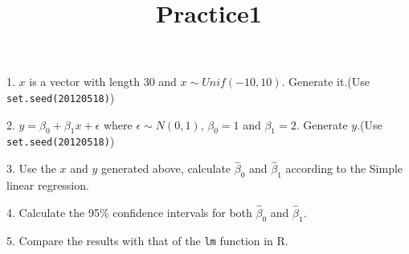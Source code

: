 \documentclass[a4paper,25pt]{article}
\title{Practice1}
\author{}
\begin{document}
\maketitle
\begin{Large}
1. $x$ is a vector with length 30 and $x \sim Unif(-10,10)$. Generate it.(Use \texttt{set.seed(20120518)})

2. $y = \beta_0 + \beta_1x + \epsilon$ where $\epsilon \sim N(0, 1)$, $\beta_0 = 1$ and $\beta_1 = 2$. Generate $y$.(Use \texttt{set.seed(20120518)})


3. Use the $x$ and $y$ generated above, calculate $\hat{\beta}_0$ and $\hat{\beta}_1$ according to the Simple linear regression.

4. Calculate the 95\% confidence intervals for both $\hat{\beta}_0$ and $\hat{\beta}_1$.

5. Compare the results with that of the \texttt{lm} function in R.

\end{Large}
\end{document}
